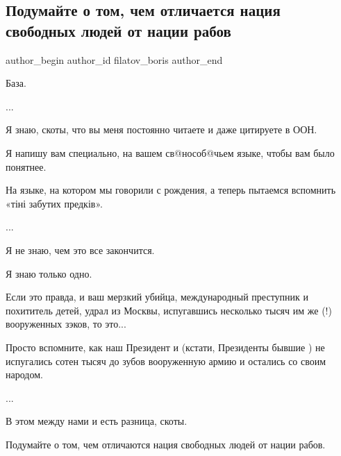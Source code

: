  
 
 
 
 

\subsection{Подумайте о том, чем отличается нация свободных людей от нации рабов}
\label{sec:24_06_2023.fb.filatov_boris.2.podumajte_o_tom_chem_otlichaetsja_nacia_svobodnyh_ljudej_ot_nacii_rabov}

\ifcmt
 author_begin
   author_id filatov_boris
 author_end
\fi

База.\par
...\par
Я знаю, скоты, что вы меня постоянно читаете и даже цитируете в ООН.\par
Я напишу вам специально, на вашем св@нособ@чьем языке, чтобы вам было понятнее.\par
На языке, на котором мы говорили с рождения, а теперь пытаемся вспомнить «тіні забутих предків».\par
...\par
Я не знаю, чем это все закончится.\par
Я знаю только одно.\par
Если это правда, и ваш мерзкий убийца, международный преступник и похититель детей, удрал из Москвы, испугавшись несколько тысяч им же (!) вооруженных зэков, то это...\par
Просто вспомните, как наш Президент и (кстати, Президенты бывшие ) не испугались сотен тысяч до зубов вооруженную армию и остались со своим народом.\par
...\par
В этом между нами и есть разница, скоты.\par
Подумайте о том, чем отличаются нация свободных людей от нации рабов.\par
